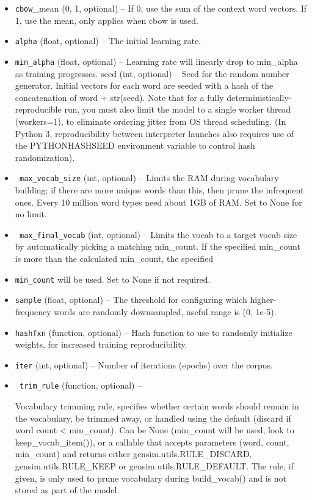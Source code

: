 \begin{itemize}
   \item \texttt{cbow}\_mean ({0, 1}, optional) – If 0, use the sum of the context word vectors. If 1, use the mean, only applies when cbow is used.
\item    \texttt{alpha} (float, optional) – The initial learning rate.
 \item   \texttt{min\_alpha} (float, optional) – Learning rate will linearly drop to min\_alpha as training progresses.
    seed (int, optional) – Seed for the random number generator. Initial vectors for each word are seeded with a hash of the concatenation of word + str(seed). Note that for a fully deterministically-reproducible run, you must also limit the model to a single worker thread (workers=1), to eliminate ordering jitter from OS thread scheduling. (In Python 3, reproducibility between interpreter launches also requires use of the PYTHONHASHSEED environment variable to control hash randomization).
\item   \texttt{ max\_vocab\_size} (int, optional) – Limits the RAM during vocabulary building; if there are more unique words than this, then prune the infrequent ones. Every 10 million word types need about 1GB of RAM. Set to None for no limit.
\item \texttt{   max\_final\_vocab} (int, optional) – Limits the vocab to a target vocab size by automatically picking a matching min\_count. If the specified min\_count is more than the calculated min\_count, the specified \item \texttt{min\_count} will be used. Set to None if not required.
 \item   \texttt{sample} (float, optional) – The threshold for configuring which higher-frequency words are randomly downsampled, useful range is (0, 1e-5).
   \item \texttt{hashfxn} (function, optional) – Hash function to use to randomly initialize weights, for increased training reproducibility.
  \item  \texttt{iter} (int, optional) – Number of iterations (epochs) over the corpus.
 \item\texttt{   trim\_rule} (function, optional) –

    Vocabulary trimming rule, specifies whether certain words should remain in the vocabulary, be trimmed away, or handled using the default (discard if word count < min\_count). Can be None (min\_count will be used, look to keep\_vocab\_item()), or a callable that accepts parameters (word, count, min\_count) and returns either gensim.utils.RULE\_DISCARD, gensim.utils.RULE\_KEEP or gensim.utils.RULE\_DEFAULT. The rule, if given, is only used to prune vocabulary during build\_vocab() and is not stored as part of the model.


\end{itemize}
